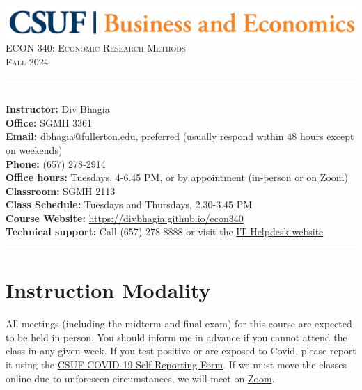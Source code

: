 \documentclass{syllabus}
\begin{document}
\begin{center}
\includegraphics[scale=0.22]{CBE-Wordmark-CMYK} \\ \vspace{0.5em}
{\large \textsc{ECON 340: Economic Research Methods}} \\
{\large \textsc{Fall 2024}}
\end{center}

\begin{center}
\begin{minipage}[t]{\textwidth}
\rule{\textwidth}{0.5pt} \\
\textbf{Instructor:} Div Bhagia \\
\textbf{Office:} SGMH 3361 \\
\textbf{Email:} dbhagia@fullerton.edu, preferred (usually respond within 48 hours except on weekends) \\
\textbf{Phone:} (657) 278-2914 \\
\textbf{Office hours:} Tuesdays, 4-6.45 PM, or by appointment (in-person or on \href{https://fullerton.zoom.us/j/81895171931}{Zoom}) \\
\textbf{Classroom:} SGMH 2113 \\
\textbf{Class Schedule:} Tuesdays and Thursdays, 2.30-3.45 PM \\
\textbf{Course Website:} \href{https://divbhagia.github.io/econ340}{https://divbhagia.github.io/econ340} \\
\textbf{Technical support:} Call (657) 278-8888 or visit the \href{https://www.fullerton.edu/it/students/helpdesk/index.php}{IT Helpdesk website} \\
\rule{\textwidth}{0.5pt} 
\end{minipage}
\end{center}

\vspace{0.35cm}
\section*{Instruction Modality}
All meetings (including the midterm and final exam) for this course are expected to be held in person. You should inform me in advance if you cannot attend the class in any given week. If you test positive or are exposed to Covid, please report it using the \href{https://coronavirus.fullerton.edu/report-covid-19-case-or-exposure/}{CSUF COVID-19 Self Reporting Form}. If we must move the classes online due to unforeseen circumstances, we will meet on \href{https://fullerton.zoom.us/j/81895171931}{Zoom}.
\end{document}
